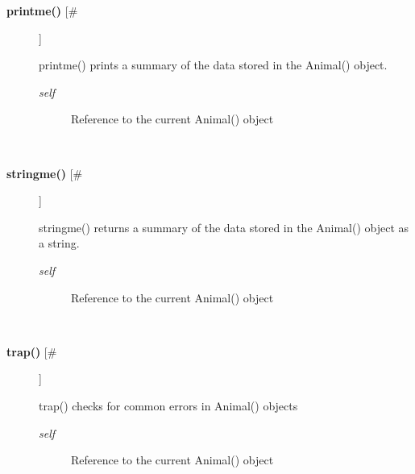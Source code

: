 \begin{description}
\item[\textbf{printme()} [\#]
]
\par printme() prints a summary of the data stored in the Animal() object.
\begin{description}
\item[\textit{self}
]
Reference to the current Animal() object
\end{description}\\

\item[\textbf{stringme()} [\#]
]
\par stringme() returns a summary of the data stored in the Animal() object
as a string.
\begin{description}
\item[\textit{self}
]
Reference to the current Animal() object
\end{description}\\

\item[\textbf{trap()} [\#]
]
\par trap() checks for common errors in Animal() objects
\begin{description}
\item[\textit{self}
]
Reference to the current Animal() object
\end{description}\\

\end{description}

